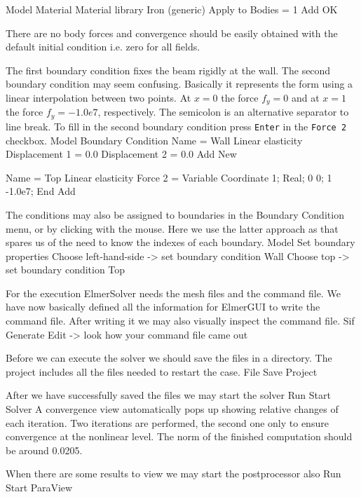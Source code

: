 \ttbegin
Model
  Material
    Material library    
      Iron (generic)
    Apply to Bodies = 1 
    Add
    OK
\ttend

There are no body forces and convergence should be easily obtained with the default 
initial condition i.e. zero for all fields.

The first boundary condition fixes the beam rigidly at the wall.
The second boundary condition may seem confusing. Basically it represents the form 
using a linear interpolation between two points. At $x=0$ the force $f_y = 0$ and 
at $x=1$ the force $f_y=-1.0e7$, respectively. The semicolon is an alternative separator
to line break. To fill in the second boundary condition press \texttt{Enter} in the 
\texttt{Force 2} checkbox.
\ttbegin
Model
  Boundary Condition
    Name = Wall
    Linear elasticity
      Displacement 1 = 0.0
      Displacement 2 = 0.0
    Add
    New

    Name = Top
    Linear elasticity 
      Force 2 = Variable Coordinate 1; Real; 0 0; 1 -1.0e7; End
    Add 
\ttend   

The conditions may also be assigned to boundaries in the Boundary Condition menu, or
by clicking with the mouse. Here we use the latter approach as that spares us of the 
need to know the indexes of each boundary.
\ttbegin
Model
  Set boundary properties
    Choose left-hand-side -> set boundary condition Wall
    Choose top -> set boundary condition Top
\ttend

For the execution 
ElmerSolver needs the mesh files and the command file. We have now basically defined
all the information for ElmerGUI to write the command file. After writing it we may also visually 
inspect the command file.
\ttbegin
Sif 
  Generate
  Edit -> look how your command file came out  
\ttend

Before we can execute the solver we should save the files in a directory. The project includes
all the files needed to restart the case.
\ttbegin
File 
  Save Project
\ttend

After we have successfully saved the files we may start the solver
\ttbegin
Run
  Start Solver
\ttend
A convergence view automatically pops up showing relative changes of each iteration.
Two iterations are performed, the second one only to ensure convergence at the nonlinear level.
The norm of the finished computation should be around 0.0205.

When there are some results to view we may start the postprocessor also
\ttbegin
Run
  Start ParaView
\ttend


